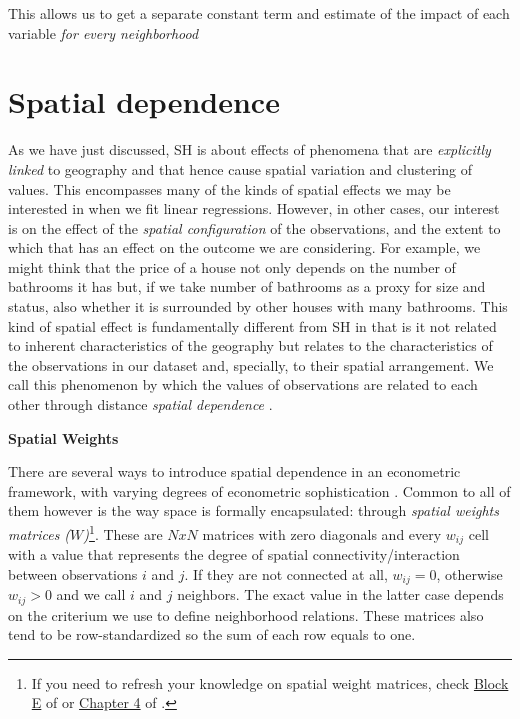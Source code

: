 \documentclass[
]{book}
\begin{document}
This allows us to get a separate constant term and estimate of the impact of each variable \emph{for every neighborhood}

\hypertarget{spatial-dependence-1}{%
\section{Spatial dependence}\label{spatial-dependence-1}}

As we have just discussed, SH is about effects of phenomena that are \emph{explicitly linked} to geography and that hence cause spatial variation and clustering of values. This encompasses many of the kinds of spatial effects we may be interested in when we fit linear regressions. However, in other cases, our interest is on the effect of the \emph{spatial configuration} of the observations, and the extent to which that has an effect on the outcome we are considering. For example, we might think that the price of a house not only depends on the number of bathrooms it has but, if we take number of bathrooms as a proxy for size and status, also whether it is surrounded by other houses with many bathrooms. This kind of spatial effect is fundamentally different from SH in that is it not related to inherent characteristics of the geography but relates to the characteristics of the observations in our dataset and, specially, to their spatial arrangement. We call this phenomenon by which the values of observations are related to each other through distance \emph{spatial dependence} \citep{anselin1988spatial}.

\textbf{Spatial Weights}

There are several ways to introduce spatial dependence in an econometric framework, with varying degrees of econometric sophistication \citep[see][ for a good overview]{anselin2003spatial}. Common to all of them however is the way space is formally encapsulated: through \emph{spatial weights matrices (\(W\))}\footnote{If you need to refresh your knowledge on spatial weight matrices, check \href{https://darribas.org/gds_course/content/bE/concepts_E.html}{Block E} of \citet{darribas_gds_course} or \href{https://geographicdata.science/book/notebooks/04_spatial_weights.html}{Chapter 4} of \citet{reyABwolf}.}. These are \(NxN\) matrices with zero diagonals and every \(w_{ij}\) cell with a value that represents the degree of spatial connectivity/interaction between observations \(i\) and \(j\). If they are not connected at all, \(w_{ij}=0\), otherwise \(w_{ij}>0\) and we call \(i\) and \(j\) neighbors. The exact value in the latter case depends on the criterium we use to define neighborhood relations. These matrices also tend to be row-standardized so the sum of each row equals to one.
\end{document}
